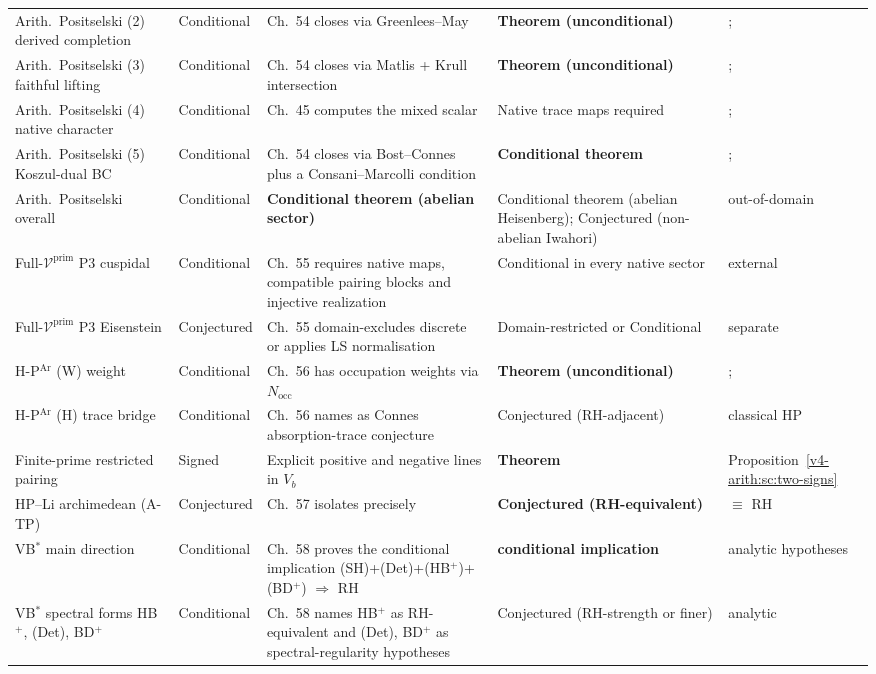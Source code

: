 \begin{longtable}{p{}|p{}|p{}|p{}|p{}}
Arith.~Positselski (2) derived completion & Conditional &
Ch.~54 closes via Greenlees--May & \textbf{Theorem (unconditional)} &; \\
Arith.~Positselski (3) faithful lifting & Conditional & Ch.~54
closes via Matlis + Krull intersection &
\textbf{Theorem (unconditional)} &; \\
Arith.~Positselski (4) native character & Conditional &
Ch.~45 computes the mixed scalar & Native trace maps required &; \\
Arith.~Positselski (5) Koszul-dual BC & Conditional & Ch.~54
closes via Bost--Connes plus a Consani--Marcolli condition &
\textbf{Conditional theorem} &; \\
Arith.~Positselski overall & Conditional &
\textbf{Conditional theorem (abelian sector)} & Conditional theorem (abelian Heisenberg);
Conjectured (non-abelian Iwahori) & out-of-domain \\
Full-\(\mathcal{V}^{\mathrm{prim}}\) P3 cuspidal & Conditional
& Ch.~55 requires native maps, compatible pairing blocks and injective realization
& Conditional in every native sector & external \\
Full-\(\mathcal{V}^{\mathrm{prim}}\) P3 Eisenstein & Conjectured &
Ch.~55 domain-excludes discrete or applies LS normalisation &
Domain-restricted or Conditional & separate \\
H-P\(^{\mathrm{Ar}}\) (W) weight & Conditional & Ch.~56
has occupation weights via \(N_{\mathrm{occ}}\) &
\textbf{Theorem (unconditional)} &; \\
H-P\(^{\mathrm{Ar}}\) (H) trace bridge & Conditional & Ch.~56
names as Connes absorption-trace conjecture & Conjectured
(RH-adjacent) & classical HP \\
Finite-prime restricted pairing & Signed & Explicit positive and
negative lines in $V_b$ & \textbf{Theorem} &
Proposition~\ref{v4-arith:sc:two-signs} \\
HP--Li archimedean (A-TP) & Conjectured & Ch.~57 isolates
precisely & \textbf{Conjectured (RH-equivalent)} & \(\equiv\) RH \\
VB\(^{*}\) main direction & Conditional & Ch.~58 proves the
conditional implication
(SH)+(Det)+(HB\(^{+}\))+(BD\(^{+}\)) \(\Rightarrow\) RH &
\textbf{conditional implication} & analytic hypotheses \\
VB\(^{*}\) spectral forms HB\(^{+}\), (Det), BD\(^{+}\) &
Conditional & Ch.~58 names HB\(^{+}\) as RH-equivalent and
(Det), BD\(^{+}\) as spectral-regularity hypotheses &
Conjectured (RH-strength or finer) & analytic \\

\end{longtable}
